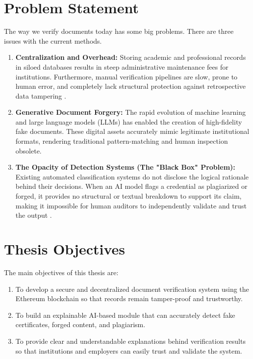\section{Problem Statement}     
    The way we verify documents today has some big problems. There are three issues with the current methods.
    \vspace{-5mm}
    \begin{enumerate}
        \item \textbf{Centralization and Overhead:} Storing academic and professional records in siloed databases results in steep administrative maintenance fees for institutions. Furthermore, manual verification pipelines are slow, prone to human error, and completely lack structural protection against retrospective data tampering \textbf{\cite{andrade2026decentralized}}.

        \item \textbf{Generative Document Forgery:} The rapid evolution of machine learning and large language models (LLMs) has enabled the creation of high-fidelity fake documents. These digital assets accurately mimic legitimate institutional formats, rendering traditional pattern-matching and human inspection obsolete.

        \item \textbf{The Opacity of Detection Systems (The "Black Box" Problem):} Existing automated classification systems do not disclose the logical rationale behind their decisions. When an AI model flags a credential as plagiarized or forged, it provides no structural or textual breakdown to support its claim, making it impossible for human auditors to independently validate and trust the output \textbf{\cite{mansoor2025explainable}}.
    \end{enumerate}



\section{Thesis Objectives}
    The main objectives of this thesis are:
    \vspace{-5mm}
    \begin{enumerate}
        \item To develop a secure and decentralized document verification system using the Ethereum blockchain so that records remain tamper-proof and trustworthy.
        \item To build an explainable AI-based module that can accurately detect fake certificates, forged content, and plagiarism.
        \item To provide clear and understandable explanations behind verification results so that institutions and employers can easily trust and validate the system.
    \end{enumerate}

